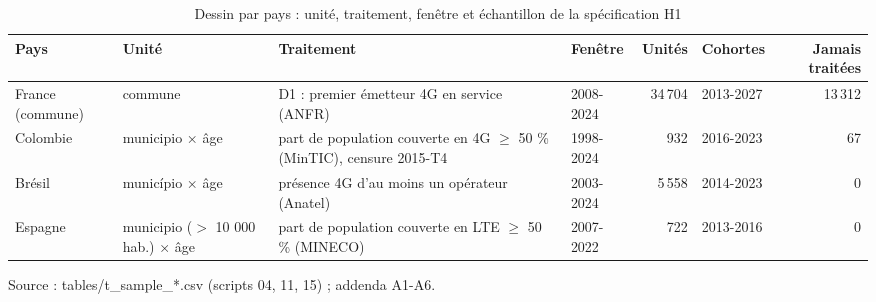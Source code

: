 \begin{table}[htbp]\centering
\begin{threeparttable}
\caption{Dessin par pays : unité, traitement, fenêtre et échantillon de la spécification H1}\label{tab:design}
\footnotesize
\begin{tabular}{lp{2.6cm}p{4.6cm}lrlr}
\toprule
Pays & Unité & Traitement & Fenêtre & Unités & Cohortes & Jamais traitées \\
\midrule
France (commune) & commune & D1 : premier émetteur 4G en service (ANFR) & 2008-2024 & 34\,704 & 2013-2027 & 13\,312 \\
Colombie & municipio × âge & part de population couverte en 4G $\geq$ 50 \% (MinTIC), censure 2015-T4 & 1998-2024 & 932 & 2016-2023 & 67 \\
Brésil & município × âge & présence 4G d'au moins un opérateur (Anatel) & 2003-2024 & 5\,558 & 2014-2023 & 0 \\
Espagne & municipio ($>$ 10 000 hab.) × âge & part de population couverte en LTE $\geq$ 50 \% (MINECO) & 2007-2022 & 722 & 2013-2016 & 0 \\
\bottomrule
\end{tabular}
\begin{tablenotes}\footnotesize
\item Source : tables/t\_sample\_*.csv (scripts 04, 11, 15) ; addenda A1-A6.
\end{tablenotes}
\end{threeparttable}
\end{table}
